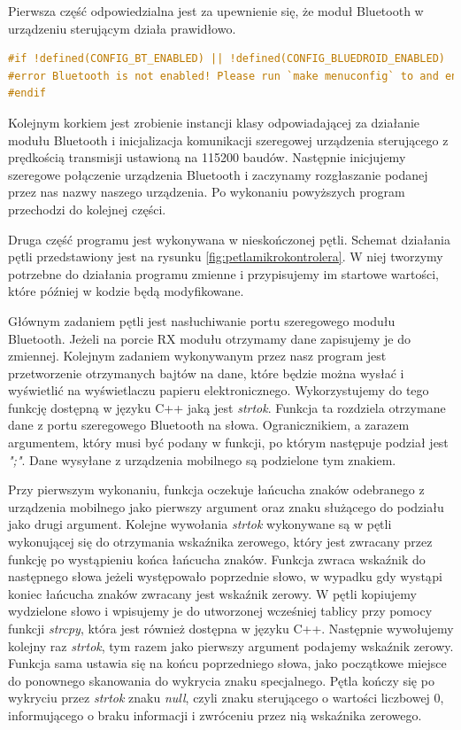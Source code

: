 \documentclass[a4paper,12pt, twoside]{article}
\begin{document}
    Pierwsza część odpowiedzialna jest za upewnienie się, że moduł Bluetooth w urządzeniu sterującym działa prawidłowo.
    \vspace{1cm}
\begin{lstlisting}[language=C++, caption=Sprawdzenie poprawności działania Bluetooth]
#if !defined(CONFIG_BT_ENABLED) || !defined(CONFIG_BLUEDROID_ENABLED)
#error Bluetooth is not enabled! Please run `make menuconfig` to and enable it
#endif\end{lstlisting}
	\vspace{.5cm}
	Kolejnym korkiem jest zrobienie instancji klasy odpowiadającej za działanie modułu Bluetooth i inicjalizacja komunikacji szeregowej urządzenia sterującego z prędkością transmisji ustawioną na 115200 baudów\cite{baud}. Następnie inicjujemy szeregowe połączenie urządzenia Bluetooth i zaczynamy rozgłaszanie podanej przez nas nazwy naszego urządzenia. Po wykonaniu powyższych program przechodzi do kolejnej części.
	
	Druga część programu jest wykonywana w nieskończonej pętli. Schemat działania pętli przedstawiony jest na rysunku \ref{fig:petlamikrokontrolera}. W niej tworzymy potrzebne do działania programu zmienne i przypisujemy im startowe wartości, które później w kodzie będą modyfikowane. 
	
	Głównym zadaniem pętli jest nasłuchiwanie portu szeregowego modułu Bluetooth. Jeżeli na porcie RX modułu otrzymamy dane zapisujemy je do zmiennej. Kolejnym zadaniem wykonywanym przez nasz program jest przetworzenie otrzymanych bajtów na dane, które będzie można wysłać i wyświetlić na wyświetlaczu papieru elektronicznego. Wykorzystujemy do tego funkcję dostępną w języku C++ jaką jest \textit{strtok}\cite{strtok}. Funkcja ta rozdziela otrzymane dane z portu szeregowego Bluetooth na słowa. Ogranicznikiem, a zarazem argumentem, który musi być podany w funkcji, po którym następuje podział jest \textit{";"}. Dane wysyłane z urządzenia mobilnego są podzielone tym znakiem. 
	
	Przy pierwszym wykonaniu, funkcja oczekuje łańcucha znaków odebranego z urządzenia mobilnego jako pierwszy argument oraz znaku służącego do podziału jako drugi argument. Kolejne wywołania \textit{strtok} wykonywane są w pętli wykonującej się do otrzymania wskaźnika zerowego, który jest zwracany przez funkcję po wystąpieniu końca łańcucha znaków. Funkcja zwraca wskaźnik do następnego słowa jeżeli występowało poprzednie słowo, w wypadku gdy wystąpi koniec łańcucha znaków zwracany jest wskaźnik zerowy. W pętli kopiujemy wydzielone słowo i wpisujemy je do utworzonej wcześniej tablicy przy pomocy funkcji \textit{strcpy}\cite{strcpy}, która jest również dostępna w języku C++. Następnie wywołujemy kolejny raz \textit{strtok}, tym razem jako pierwszy argument podajemy wskaźnik zerowy. Funkcja sama ustawia się na końcu poprzedniego słowa, jako początkowe miejsce do ponownego skanowania do wykrycia znaku specjalnego. Pętla kończy się po wykryciu przez \textit{strtok} znaku \textit{null}, czyli znaku sterującego o wartości liczbowej 0, informującego o braku informacji\cite{null} i zwróceniu przez nią wskaźnika zerowego. 
	
\end{document}
